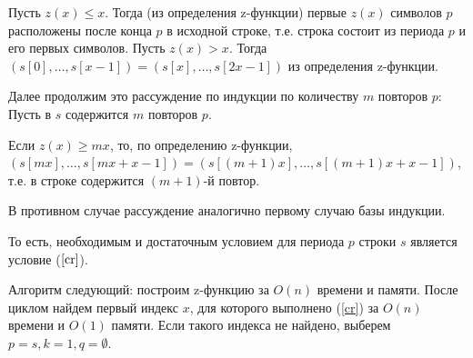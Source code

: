 \documentclass{article}
\begin{document}
Пусть $z(x)\leq x$. Тогда (из определения z-функции) первые $z(x)$ символов $p$ расположены после конца $p$ в исходной строке, т.е. строка состоит из периода $p$ и его первых символов.
Пусть $z(x)>x$. Тогда $(s[0],\dots,s[x-1])=(s[x],\dots,s[2x-1])$ из определения z-функции.

Далее продолжим это рассуждение по индукции по количеству $m$ повторов $p$: Пусть в $s$ содержится $m$ повторов $p$.

Если $z(x)\geq mx$, то, по определению z-функции, $(s[mx],\dots,s[mx+x-1])=(s[(m+1)x],\dots,s[(m+1)x+x-1])$, т.е. в строке содержится $(m+1)$-й повтор.

В противном случае рассуждение аналогично первому случаю базы индукции.

То есть, необходимым и достаточным условием для периода $p$ строки $s$ является условие ($\ref{cr}$).

Алгоритм следующий: построим z-функцию за $O(n)$ времени и памяти. После циклом найдем первый индекс $x$, для которого выполнено (\ref{cr}) за $O(n)$ времени и $O(1)$ памяти. Если такого индекса не найдено, выберем $p=s, k=1, q=\emptyset$.
\end{document}
